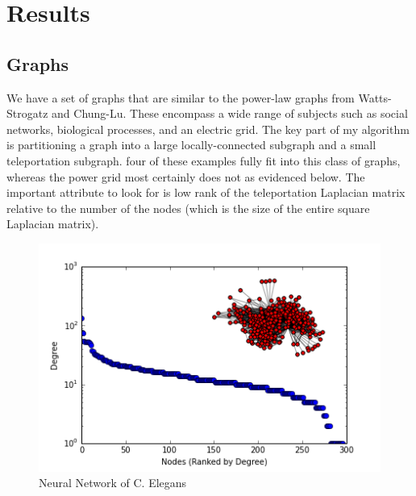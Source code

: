 \documentclass{article}
\begin{document}
\section{Results}
\subsection{Graphs}
We have a set of graphs that are similar to the power-law graphs from Watts-Strogatz and Chung-Lu. These encompass a wide range of subjects such as social networks, biological processes, and an electric grid. The key part of my algorithm is partitioning a graph into a large locally-connected subgraph and a small teleportation subgraph. four of these examples fully fit into this class of graphs, whereas the power grid most certainly does not as evidenced below. The important attribute to look for is low rank of the teleportation Laplacian matrix relative to the number of the nodes (which is the size of the entire square Laplacian matrix).\\


\begin{figure}
\centering

\includegraphics[width=\linewidth]{neural_degree_histogram.png}
\caption{Neural Network of C. Elegans \cite{White:1986,Watts:1998}}
  
\end{figure}
\end{document}
